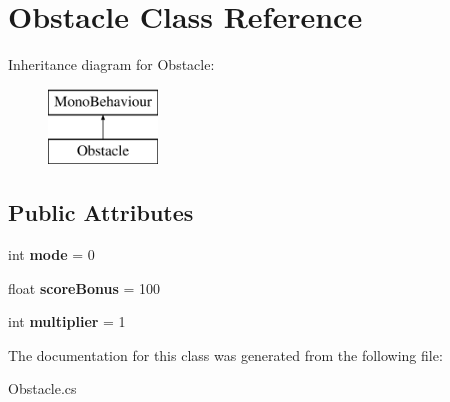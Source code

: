 \hypertarget{class_obstacle}{}\section{Obstacle Class Reference}
\label{class_obstacle}
Inheritance diagram for Obstacle\+:\begin{figure}[H]
\begin{center}
\leavevmode
\includegraphics[height=2.000000cm]{class_obstacle}
\end{center}
\end{figure}
\subsection*{Public Attributes}
\begin{DoxyCompactItemize}
\item 
\mbox{\label{class_obstacle_ade7caf7691e15d73c3ea585f3440471e}} 
int {\bfseries mode} = 0
\item 
\mbox{\label{class_obstacle_a7c7ff9b4205e4ec5334d6116ede6c452}} 
float {\bfseries score\+Bonus} = 100
\item 
\mbox{\label{class_obstacle_a8c31a16efd6da81b7dff1e7be88f84da}} 
int {\bfseries multiplier} = 1
\end{DoxyCompactItemize}


The documentation for this class was generated from the following file\+:\begin{DoxyCompactItemize}
\item 
Obstacle.\+cs\end{DoxyCompactItemize}
